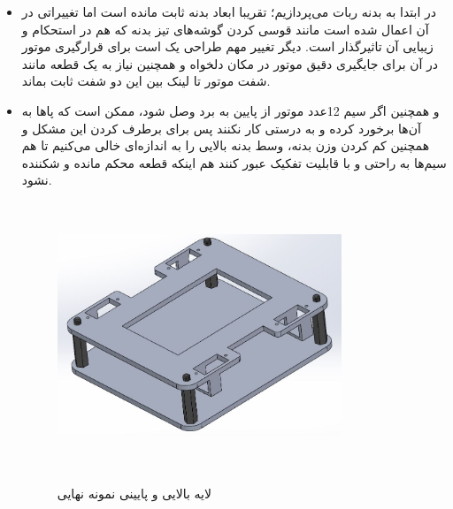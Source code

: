 \begin{itemize}
	\item در ابتدا به بدنه ربات می‌پردازیم؛ تقریبا ابعاد بدنه ثابت مانده است اما تغییراتی در آن اعمال شده است مانند قوسی 
	\unskip{}
	کردن گوشه‌های تیز بدنه که هم در استحکام و زیبایی آن تاثیرگذار است. دیگر تغییر مهم طراحی یک  است برای قرارگیری موتور در آن برای جایگیری دقیق موتور در مکان دلخواه و همچنین نیاز به یک قطعه مانند شفت موتور تا لینک بین این دو شفت ثابت بماند.
	\item و همچنین اگر سیم 12عدد موتور از پایین به برد وصل شود، ممکن است که پاها به آن‌ها برخورد کرده و به درستی کار نکنند پس برای برطرف کردن این مشکل و همچنین کم کردن وزن بدنه، وسط بدنه بالایی را به اندازه‌ای خالی می‌کنیم تا هم سیم‌ها به راحتی و با قابلیت تفکیک عبور کنند هم اینکه قطعه محکم مانده و شکننده نشود.
	
	\begin{figure}[!h]	
	\vspace{0.2cm}
	\centering
	\includegraphics[height=8cm,width=8.5cm]{./Images/CH2/Upper_Bottom_Layer_Final.JPG}
	‌\caption{لایه بالایی و پایینی نمونه نهایی}
	\label{بدنه ربات نمونه نهایی}
	\end{figure}
	

\end{itemize}
